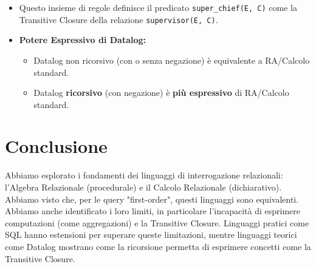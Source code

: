 \documentclass{article}
\begin{document}
\begin{itemize}
\begin{verbatim}
		\end{verbatim}
		\item Questo insieme di regole definisce il predicato \texttt{super\_chief(E, C)} come la Transitive Closure della relazione \texttt{supervisor(E, C)}.
		\item \textbf{Potere Espressivo di Datalog:}
		\begin{itemize}
			\item Datalog non ricorsivo (con o senza negazione) è equivalente a RA/Calcolo standard.
			\item Datalog \textbf{ricorsivo} (con negazione) è \textbf{più espressivo} di RA/Calcolo standard.
		\end{itemize}
	\end{itemize}
	
	\section{Conclusione}
	Abbiamo esplorato i fondamenti dei linguaggi di interrogazione relazionali: l'Algebra Relazionale (procedurale) e il Calcolo Relazionale (dichiarativo). Abbiamo visto che, per le query "first-order", questi linguaggi sono equivalenti. Abbiamo anche identificato i loro limiti, in particolare l'incapacità di esprimere computazioni (come aggregazioni) e la Transitive Closure. Linguaggi pratici come SQL hanno estensioni per superare queste limitazioni, mentre linguaggi teorici come Datalog mostrano come la ricorsione permetta di esprimere concetti come la Transitive Closure.
	
\end{document}
